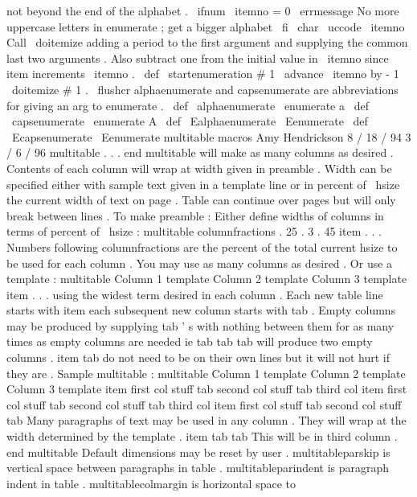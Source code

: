 {{{{{{not
beyond
the
end
of
the
alphabet
.
\
ifnum
\
itemno
=
0
\
errmessage
{
No
more
uppercase
letters
in
enumerate
;
get
a
bigger
alphabet
}
\
fi
\
char
\
uccode
\
itemno
}
%
}
%
Call
\
doitemize
adding
a
period
to
the
first
argument
and
supplying
the
%
common
last
two
arguments
.
Also
subtract
one
from
the
initial
value
in
%
\
itemno
since
item
increments
\
itemno
.
%
\
def
\
startenumeration
#
1
{
%
\
advance
\
itemno
by
-
1
\
doitemize
{
#
1
.
}
\
flushcr
}
%
alphaenumerate
and
capsenumerate
are
abbreviations
for
giving
an
arg
%
to
enumerate
.
%
\
def
\
alphaenumerate
{
\
enumerate
{
a
}
}
\
def
\
capsenumerate
{
\
enumerate
{
A
}
}
\
def
\
Ealphaenumerate
{
\
Eenumerate
}
\
def
\
Ecapsenumerate
{
\
Eenumerate
}
%
multitable
macros
%
Amy
Hendrickson
8
/
18
/
94
3
/
6
/
96
%
%
multitable
.
.
.
end
multitable
will
make
as
many
columns
as
desired
.
%
Contents
of
each
column
will
wrap
at
width
given
in
preamble
.
Width
%
can
be
specified
either
with
sample
text
given
in
a
template
line
%
or
in
percent
of
\
hsize
the
current
width
of
text
on
page
.
%
Table
can
continue
over
pages
but
will
only
break
between
lines
.
%
To
make
preamble
:
%
%
Either
define
widths
of
columns
in
terms
of
percent
of
\
hsize
:
%
multitable
columnfractions
.
25
.
3
.
45
%
item
.
.
.
%
%
Numbers
following
columnfractions
are
the
percent
of
the
total
%
current
hsize
to
be
used
for
each
column
.
You
may
use
as
many
%
columns
as
desired
.
%
Or
use
a
template
:
%
multitable
{
Column
1
template
}
{
Column
2
template
}
{
Column
3
template
}
%
item
.
.
.
%
using
the
widest
term
desired
in
each
column
.
%
Each
new
table
line
starts
with
item
each
subsequent
new
column
%
starts
with
tab
.
Empty
columns
may
be
produced
by
supplying
tab
'
s
%
with
nothing
between
them
for
as
many
times
as
empty
columns
are
needed
%
ie
tab
tab
tab
will
produce
two
empty
columns
.
%
item
tab
do
not
need
to
be
on
their
own
lines
but
it
will
not
hurt
%
if
they
are
.
%
Sample
multitable
:
%
multitable
{
Column
1
template
}
{
Column
2
template
}
{
Column
3
template
}
%
item
first
col
stuff
tab
second
col
stuff
tab
third
col
%
item
%
first
col
stuff
%
tab
%
second
col
stuff
%
tab
%
third
col
%
item
first
col
stuff
tab
second
col
stuff
%
tab
Many
paragraphs
of
text
may
be
used
in
any
column
.
%
%
They
will
wrap
at
the
width
determined
by
the
template
.
%
item
tab
tab
This
will
be
in
third
column
.
%
end
multitable
%
Default
dimensions
may
be
reset
by
user
.
%
multitableparskip
is
vertical
space
between
paragraphs
in
table
.
%
multitableparindent
is
paragraph
indent
in
table
.
%
multitablecolmargin
is
horizontal
space
to
}}}}
